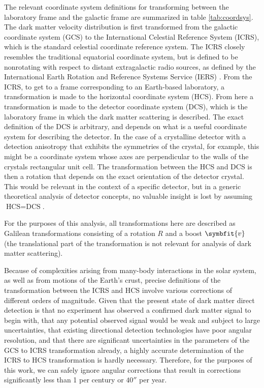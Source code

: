 \documentclass[b5paper, 10pt, twoside]{book}
\renewcommand{\vec}[1]{\symbfit{#1}}
\begin{document}
The relevant coordinate system definitions for transforming between the laboratory frame and the galactic frame are summarized in table \ref{tab:coordsys}. The dark matter velocity distribution is first transformed from the galactic coordinate system (GCS) to the International Celestial Reference System (ICRS), which is the standard celestial coordinate reference system. The ICRS closely resembles the traditional equatorial coordinate system, but is defined to be nonrotating with respect to distant extragalactic radio sources, as defined by the International Earth Rotation and Reference Systems Service (IERS) \parencite{MaFeissel1997}. From the ICRS, to get to a frame corresponding to an Earth-based laboratory, a transformation is made to the horizontal coordinate system (HCS). From here a transformation is made to the detector coordinate system (DCS), which is the laboratory frame in which the dark matter scattering is described. The exact definition of the DCS is arbitrary, and depends on what is a useful coordinate system for describing the detector. In the case of a crystalline detector with a detection anisotropy that exhibits the symmetries of the crystal, for example, this might be a coordinate system whose axes are perpendicular to the walls of the crystals rectangular unit cell. The transformation between the HCS and DCS is then a rotation that depends on the exact orientation of the detector crystal. This would be relevant in the context of a specific detector, but in a generic theoretical analysis of detector concepts, no valuable insight is lost by assuming $\text{HCS}=\text{DCS}$.

For the purposes of this analysis, all transformations here are described as Galilean transformations consisting of a rotation $R$ and a boost $\vec{v}$ (the translational part of the transformation is not relevant for analysis of dark matter scattering).

Because of complexities arising from many-body interactions in the solar system, as well as from motions of the Earth's crust, precise definitions of the transformation between the ICRS and HCS involve various corrections of different orders of magnitude. Given that the present state of dark matter direct detection is that no experiment has observed a confirmed dark matter signal to begin with, that any potential observed signal would be weak and subject to large uncertainties, that existing directional detection technologies have poor angular resolution, and that there are significant uncertainties in the parameters of the GCS to ICRS transformation already, a highly accurate determination of the ICRS to HCS transformation is hardly necessary. Therefore, for the purposes of this work, we can safely ignore angular corrections that result in corrections significantly less than 1\degree{} per century or $40''$ per year.
\end{document}
